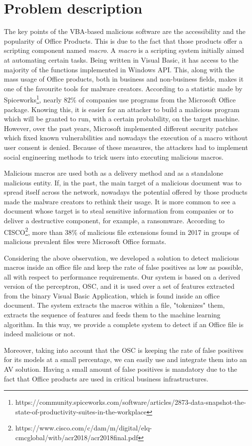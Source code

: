 \section{Problem description}

The key points of the VBA-based malicious software are the accessibility and the popularity of Office Products. This is due to the fact that those products offer a scripting component named \textit{macro}. A \textit{macro} is a scripting system initially aimed at automating certain tasks. Being written in Visual Basic, it has access to the majority of the functions implemented in Windows API. This, along with the mass usage of Office products, both in business and non-business fields, makes it one of the favourite tools for malware creators. According to a statistic made by Spiceworks\footnote{https://community.spiceworks.com/software/articles/2873-data-snapshot-the-state-of-productivity-suites-in-the-workplace}, nearly 82\% of companies use programs from the Microsoft Office package. Knowing this, it is easier for an attacker to build a malicious program which will be granted to run, with a certain probability, on the target machine. However, over the past years, Microsoft implemented different security patches which fixed known vulnerabilities and nowadays the execution of a macro without user consent is denied. Because of these measures, the attackers had to implement social engineering methods to trick users into executing malicious macros.
\par
Malicious macros are used both as a delivery method and as a standalone malicious entity. If, in the past, the main target of a malicious document was to spread itself across the network, nowadays the potential offered by those products made the malware creators to rethink their usage. It is more common to see a document whose target is to steal sensitive information from companies or to deliver a destructive component, for example, a ransomware. According to CISCO\footnote{https://www.cisco.com/c/dam/m/digital/elq-cmcglobal/witb/acr2018/acr2018final.pdf}, more than 38\% of malicious file extensions found in 2017 in groups of malicious prevalent files were Microsoft Office formats.
\par
Considering the above observation, we developed a solution to detect malicious macros inside an office file and keep the rate of false positives as low as possible, all with respect to performance requirements. Our system is based on a derived version of the perceptron, OSC\cite{OSC}, and it is used over a set of features extracted from the binary Visual Basic Application, which is found inside an office document. The system extracts the macros within a file, "tokenizes" them, extracts the sequence of features and feeds them to the machine learning algorithm. In this way, we provide a complete system to detect if an Office file is indeed malicious or not.
\par
Moreover, taking into account that the OSC is keeping the rate of false positives for its models at a small percentage, we can easily use and integrate them into an AV solution. Having a small amount of false positives is mandatory due to the fact that Office products are used in critical business infrastructures.
